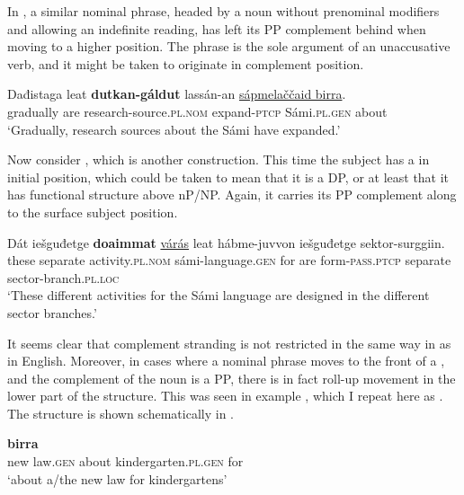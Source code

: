 \documentclass[output=paper]{LSP/langsci}
\begin{document}
In , a similar nominal phrase, headed by a noun without prenominal modifiers and allowing an indefinite reading, has left its PP complement behind when moving to a higher position. The phrase is the sole argument of an unaccusative verb, and it might be taken to originate in complement position.

\ea%
    \label{ex:julien:28}
   
    \gll  Dađistaga  leat  \textbf{dutkan-gáldut}        lassán-an    \uline{sápmelaččaid  birra}.   \\ 
	 gradually  are  research-source.\textsc{pl}.\textsc{nom}  expand-\textsc{ptcp}  Sámi.\textsc{pl.gen}  about\\
    \glt   ‘Gradually, research sources about the Sámi have expanded.’
    \z

Now consider , which is another  construction. This time the  subject has a  in initial position, which could be taken to mean that it is a DP, or at least that it has functional structure above nP/NP. Again, it carries its PP complement along to the surface subject position. 

\ea%
    \label{ex:julien:29}
   
    \gll   Dát  iešguđetge  \textbf{doaimmat}              \uline{várás}    leat     hábme-juvvon    iešguđetge  sektor-surggiin. \\ 
	these  separate    activity.\textsc{pl.nom}  sámi-language.\textsc{gen}  for      are    form-\textsc{pass.ptcp}  separate    sector-branch.\textsc{pl.loc}\\
    \glt  ‘These different activities for the Sámi language are designed in the different sector branches.’
    \z

It seems clear that complement stranding is not restricted in the same way in  as in English. Moreover, in cases where a nominal phrase moves to the front of a , and the complement of the noun is a PP, there is in fact roll-up movement in the lower part of the structure. This was seen in example , which I repeat here as . The structure is shown schematically in .


\ea%
    \label{ex:julien:30}
    \ea\label{ex:julien:30a}
    \gll    {}        \textbf{birra}            \\ 
	     new  law.\textsc{gen}   about    kindergarten.\textsc{pl}.\textsc{gen}    for\\
    \glt      ‘about a/the new law for kindergartens’
    
\end{document}
